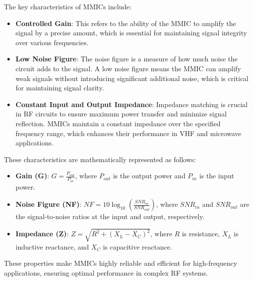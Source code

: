 The key characteristics of MMICs include:
\begin{itemize}
    \item \textbf{Controlled Gain}: This refers to the ability of the MMIC to amplify the signal by a precise amount, which is essential for maintaining signal integrity over various frequencies.
    \item \textbf{Low Noise Figure}: The noise figure is a measure of how much noise the circuit adds to the signal. A low noise figure means the MMIC can amplify weak signals without introducing significant additional noise, which is critical for maintaining signal clarity.
    \item \textbf{Constant Input and Output Impedance}: Impedance matching is crucial in RF circuits to ensure maximum power transfer and minimize signal reflection. MMICs maintain a constant impedance over the specified frequency range, which enhances their performance in VHF and microwave applications.
\end{itemize}

These characteristics are mathematically represented as follows:
\begin{itemize}
    \item \textbf{Gain (G)}: \( G = \frac{P_{out}}{P_{in}} \), where \( P_{out} \) is the output power and \( P_{in} \) is the input power.
    \item \textbf{Noise Figure (NF)}: \( NF = 10 \log_{10} \left( \frac{SNR_{in}}{SNR_{out}} \right) \), where \( SNR_{in} \) and \( SNR_{out} \) are the signal-to-noise ratios at the input and output, respectively.
    \item \textbf{Impedance (Z)}: \( Z = \sqrt{R^2 + (X_L - X_C)^2} \), where \( R \) is resistance, \( X_L \) is inductive reactance, and \( X_C \) is capacitive reactance.
\end{itemize}

These properties make MMICs highly reliable and efficient for high-frequency applications, ensuring optimal performance in complex RF systems.

